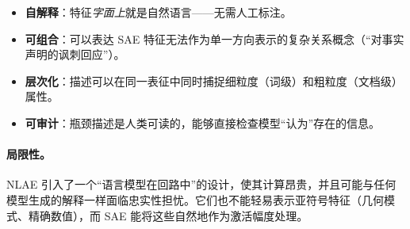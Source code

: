\begin{itemize}
  \item \textbf{自解释}：特征\emph{字面上}就是自然语言——无需人工标注。
  \item \textbf{可组合}：可以表达 SAE 特征无法作为单一方向表示的复杂关系概念（``对事实声明的讽刺回应''）。
  \item \textbf{层次化}：描述可以在同一表征中同时捕捉细粒度（词级）和粗粒度（文档级）属性。
  \item \textbf{可审计}：瓶颈描述是人类可读的，能够直接检查模型``认为''存在的信息。
\end{itemize}

\paragraph{局限性。}
\label{limitations.}

NLAE 引入了一个``语言模型在回路中''的设计，使其计算昂贵，并且可能与任何模型生成的解释一样面临忠实性担忧。它们也不能轻易表示亚符号特征（几何模式、精确数值），而 SAE 能将这些自然地作为激活幅度处理。

